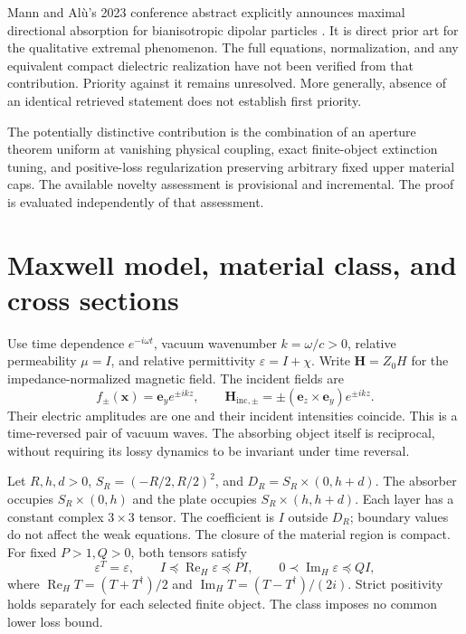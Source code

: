 \documentclass[11pt]{article}
\newcommand{\ReH}{\operatorname{Re}_{\!H}}
\newcommand{\ImH}{\operatorname{Im}_{\!H}}
\newcommand{\ey}{\mathbf e_y}
\newcommand{\ez}{\mathbf e_z}
\begin{document}
Mann and Al\`u's 2023 conference abstract explicitly announces maximal directional absorption for bianisotropic dipolar particles \citep{MannAlu2023}. It is direct prior art for the qualitative extremal phenomenon. The full equations, normalization, and any equivalent compact dielectric realization have not been verified from that contribution. Priority against it remains unresolved. More generally, absence of an identical retrieved statement does not establish first priority.

The potentially distinctive contribution is the combination of an aperture theorem uniform at vanishing physical coupling, exact finite-object extinction tuning, and positive-loss regularization preserving arbitrary fixed upper material caps. The available novelty assessment is provisional and incremental. The proof is evaluated independently of that assessment.

\section{Maxwell model, material class, and cross sections}\label{sec:model}
Use time dependence $e^{-i\omega t}$, vacuum wavenumber $k=\omega/c>0$, relative permeability $\mu=I$, and relative permittivity $\varepsilon=I+\chi$. Write $\mathbf H=Z_0H$ for the impedance-normalized magnetic field. The incident fields are
\begin{equation}\label{eq:incident}
 f_\pm(\mathbf x)=\ey e^{\pm ikz},\qquad
 \mathbf H_{\mathrm{inc},\pm}=\pm(\ez\times\ey)e^{\pm ikz}.
\end{equation}
Their electric amplitudes are one and their incident intensities coincide. This is a time-reversed pair of vacuum waves. The absorbing object itself is reciprocal, without requiring its lossy dynamics to be invariant under time reversal.

Let $R,h,d>0$, $S_R=(-R/2,R/2)^2$, and $D_R=S_R\times(0,h+d)$. The absorber occupies $S_R\times(0,h)$ and the plate occupies $S_R\times(h,h+d)$. Each layer has a constant complex $3\times3$ tensor. The coefficient is $I$ outside $D_R$; boundary values do not affect the weak equations. The closure of the material region is compact. For fixed $P>1,Q>0$, both tensors satisfy
\begin{equation}\label{eq:material}
 \varepsilon^T=\varepsilon,\qquad
 I\preceq\ReH\varepsilon\preceq PI,\qquad
 0\prec\ImH\varepsilon\preceq QI,
\end{equation}
where $\ReH T=(T+T^\dagger)/2$ and $\ImH T=(T-T^\dagger)/(2i)$. Strict positivity holds separately for each selected finite object. The class imposes no common lower loss bound.
\end{document}
